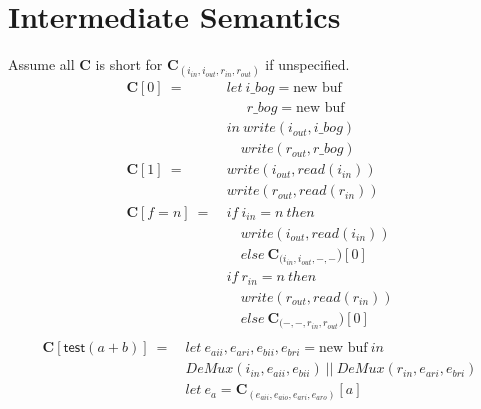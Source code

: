 \documentclass[12pt, letterpaper]{article}
\begin{document}
  \clearpage
  \section{Intermediate Semantics}\label{sec:icomp}
    
    Assume all $\mathbf{C}$ is short for $\mathbf{C}_{(i_{in},i_{out},r_{in},r_{out})}$ if unspecified.
    {\fontsize{12pt}{14pt}\selectfont
    \begin{align*}
      \mathbf{C}[0]\ 
        =\ &
        let\ i\_bog = \text{new buf}\\
        &\quad\ \ r\_bog = \text{new buf}\\
        &in\ write(i_{out}, i\_bog)\\
        &\quad  write(r_{out}, r\_bog)\\
      \mathbf{C}[1]\ 
        =\ &
        write(i_{out}, read(i_{in}))\\
        &write(r_{out}, read(r_{in}))
        \\
      \mathbf{C}[f = n]\
         =\
         &if\ i_{in}=n\ then\\
         &\quad write(i_{out}, read(i_{in}))\\
         &\quad else\ \mathbf{C}_{(i_{in}, i_{out}, -, -})[0]\\
         &if\ r_{in}=n\ then\\
         &\quad write(r_{out}, read(r_{in}))\\
         &\quad else\ \mathbf{C}_{(-, -, r_{in}, r_{out}})[0]\\
    \end{align*}
    \begin{align*}
      \mathbf{C}[\mathsf{test}(a + b)]\ 
        =\ &
        let\ e_{aii}, e_{ari}, e_{bii}, e_{bri} = \text{new buf}\ in\\
           &DeMux(i_{in}, e_{aii}, e_{bii})\ ||\ DeMux(r_{in}, e_{ari}, e_{bri})\\
        &let\ e_a = \mathbf{C}_{(e_{aii},e_{aio},e_{ari},e_{aro})}[a]\\

\end{align*}}
\end{document}
